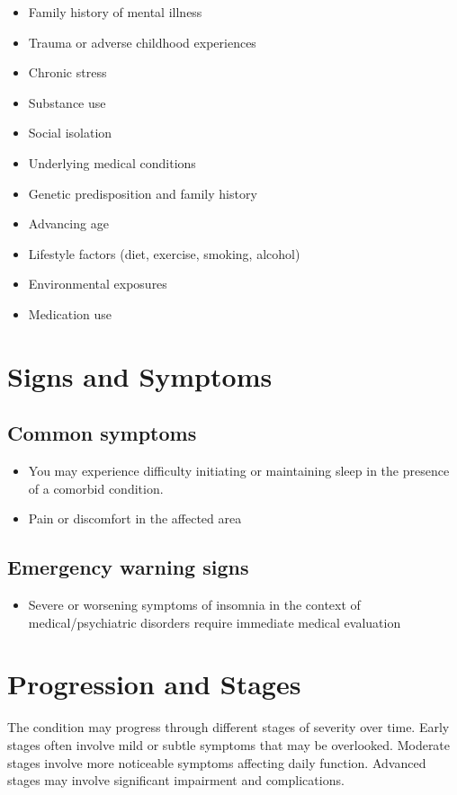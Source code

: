 \begin{itemize}[noitemsep]
  \item Family history of mental illness
  \item Trauma or adverse childhood experiences
  \item Chronic stress
  \item Substance use
  \item Social isolation
  \item Underlying medical conditions
  \item Genetic predisposition and family history
  \item Advancing age
  \item Lifestyle factors (diet, exercise, smoking, alcohol)
  \item Environmental exposures
  \item Medication use
\end{itemize}
\section{Signs and Symptoms}

\subsection{Common symptoms}
\begin{itemize}[noitemsep]
  \item You may experience difficulty initiating or maintaining sleep in the presence of a comorbid condition.
  \item Pain or discomfort in the affected area
  \end{itemize}

\subsection{Emergency warning signs}
\begin{itemize}[noitemsep]
  \item Severe or worsening symptoms of insomnia in the context of medical/psychiatric disorders require immediate medical evaluation
\end{itemize}
\section{Progression and Stages}
The condition may progress through different stages of severity over time. Early stages often involve mild or subtle symptoms that may be overlooked. Moderate stages involve more noticeable symptoms affecting daily function. Advanced stages may involve significant impairment and complications.
